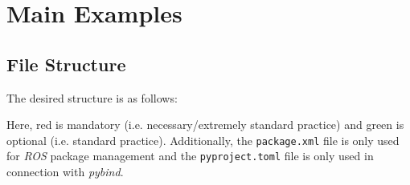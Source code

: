 \section{Main Examples} \label{s:main_examples}



\subsection{File Structure} \label{ss:main_examples/file_structure}
The desired structure is as follows:

Here, red is mandatory (i.e. necessary/extremely standard practice) and green is optional (i.e. standard practice).
Additionally, the \texttt{package.xml} file is only used for \textit{ROS} package management and the \texttt{pyproject.toml} file is only used in connection with \textit{pybind}.


\vspace{1cm}
